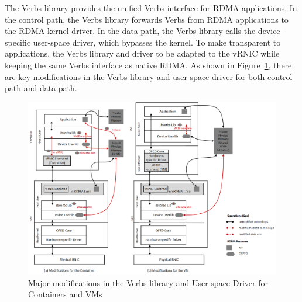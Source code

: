 
The Verbs library provides the unified Verbs interface for RDMA applications. In the control path, the Verbs library forwards Verbs from RDMA applications to the RDMA kernel driver. In the data path, the Verbs library calls the device-specific user-space driver, which bypasses the kernel. To make \sys transparent to applications, the Verbs library and driver to be adapted to the vRNIC while keeping the same Verbs interface as native RDMA. As shown in Figure~\ref{fig:verbs-driver}, there are key modifications in the Verbs library and user-space driver for both control path and data path.

\begin{figure}[!ht]
	\centering
	\includegraphics[width=0.8\linewidth]{images/verbs-driver}
	\caption{Major modifications in the Verbs library and User-space Driver for Containers and VMs}
	\label{fig:verbs-driver}
\end{figure}


